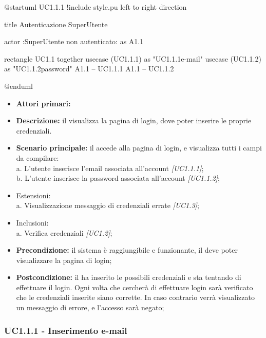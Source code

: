 \documentclass[../analisi-dei-requisiti]{subfiles}
\begin{document}
\begin{plantuml}
@startuml UC1.1.1
!include style.pu
left to right direction

title Autenticazione SuperUtente

actor :SuperUtente non autenticato: as A1.1

rectangle UC1.1{
  together {
  usecase (UC1.1.1) as "UC1.1.1\nInserimento e-mail"
  usecase (UC1.1.2) as "UC1.1.2\nInserimento password"
  }
}
A1.1 -- UC1.1.1
A1.1 -- UC1.1.2

@enduml
\end{plantuml}


\begin{itemize}
  \item \textbf{Attori primari:} 
  \item \textbf{Descrizione:} il  visualizza la pagina di login, dove poter inserire le proprie credenziali.
  \item \textbf{Scenario principale:} il  accede alla pagina di login, e visualizza tutti i campi da compilare:
        \\a. L'utente inserisce l’email associata all’account \emph{[UC1.1.1]};
        \\b. L'utente inserisce la password associata all’account \emph{[UC1.1.2]};
  \item Estensioni:
        \\a. Visualizzazione messaggio di credenziali errate \emph{[UC1.3]};
  \item Inclusioni:
        \\a. Verifica credenziali \emph{[UC1.2]};
  \item \textbf{Precondizione:} il sistema è raggiungibile e funzionante, il  deve poter visualizzare la pagina di login;
  \item \textbf{Postcondizione:} il  ha inserito le possibili credenziali e sta tentando di effettuare il login. Ogni volta che cercherà di effettuare
        login sarà verificato che le credenziali inserite siano corrette. In caso contrario verrà visualizzato un messaggio di errore, e l'accesso sarà negato;

\end{itemize}

\subsubsection{UC1.1.1 - Inserimento e-mail}
\label{subsub:UC1.1.1}
\end{document}
